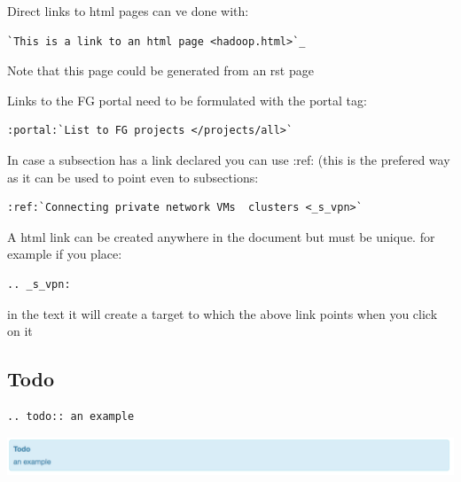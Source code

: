Direct links to html pages can ve done with:

\begin{verbatim}
`This is a link to an html page <hadoop.html>`_
\end{verbatim}

Note that this page could be generated from an rst page

Links to the FG portal need to be formulated with the portal tag:

\begin{verbatim}
:portal:`List to FG projects </projects/all>`
\end{verbatim}

In case a subsection has a link declared you can use :ref: (this is the
prefered way as it can be used to point even to subsections:

\begin{verbatim}
:ref:`Connecting private network VMs  clusters <_s_vpn>` 
\end{verbatim}

A html link can be created anywhere in the document but must be unique.
for example if you place:

\begin{verbatim}
.. _s_vpn:
\end{verbatim}

in the text it will create a target to which the above link points when
you click on it

\subsection{Todo}\label{todo}

\begin{verbatim}
.. todo:: an example
\end{verbatim}

\includegraphics[width=\columnwidth]{images/todo.png}
